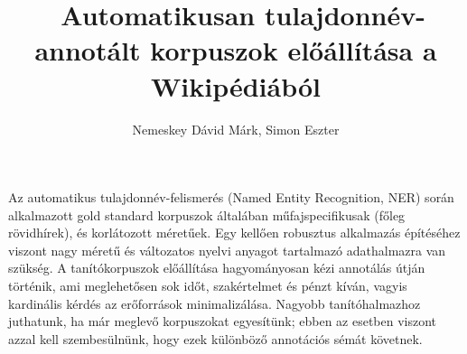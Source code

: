 \documentclass{llncs}
\begin{document}
\pagestyle{myheadings}
\def\leftmark{{\rm IX. Magyar Sz\'am\'\i t\'og\'epes Nyelv\'eszeti Konferencia}}
\def\rightmark{{\rm Szeged, 2013. január 7-8.}}

\setcounter{page}{3}

\title{\ \break Automatikusan tulajdonnév-annotált korpuszok előállítása a Wikipédiából}
\author{Nemeskey Dávid Márk, Simon Eszter}

\maketitle





Az automatikus tulajdonnév-felismerés (Named Entity Recognition, NER) során alkalmazott
gold standard korpuszok általában műfajspecifikusak (főleg rövidhírek), és korlátozott
méretűek. Egy kellően robusztus alkalmazás építéséhez viszont nagy méretű és változatos
nyelvi anyagot tartalmazó adathalmazra van szükség. A tanítókorpuszok előállítása
hagyományosan kézi annotálás útján tör\-té\-nik, ami meglehetősen sok időt, szakértelmet és
pénzt kíván, vagyis kardinális kérdés az erőforrások minimalizálása. Nagyobb
tanítóhalmazhoz juthatunk, ha már meglevő korpuszokat egyesítünk; ebben az esetben
viszont azzal kell szembesülnünk, hogy ezek különböző annotációs sémát követnek. 
\end{document}
